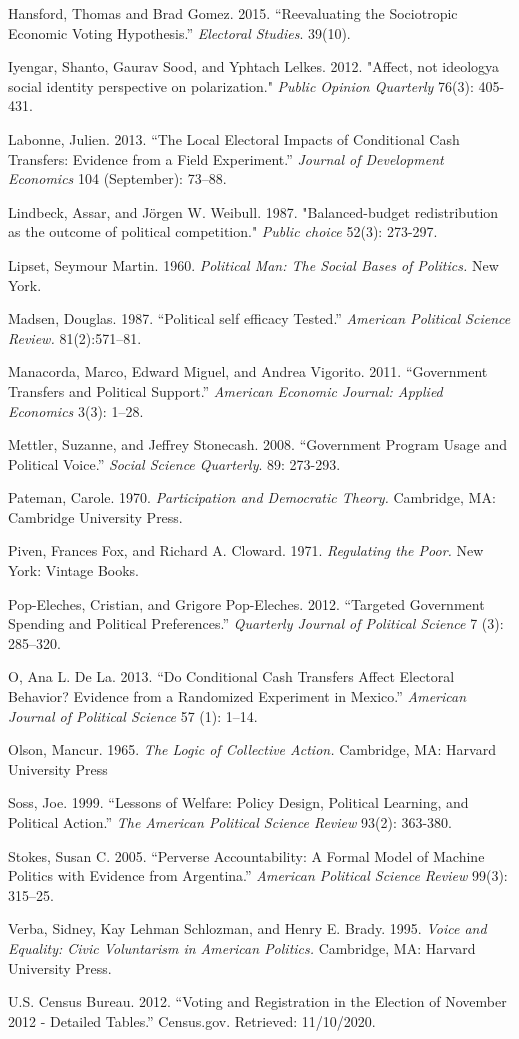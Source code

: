 \documentclass[12pt]{paper}
\begin{document}
\begin{hangparas}{.25in}{1}
Hansford, Thomas and Brad Gomez. 2015. “Reevaluating the Sociotropic Economic Voting Hypothesis.” \textit{Electoral Studies}. 39(10).

Iyengar, Shanto, Gaurav Sood, and Yphtach Lelkes. 2012. "Affect, not ideologya social identity perspective on polarization." \textit{Public Opinion Quarterly} 76(3): 405-431.

Labonne, Julien. 2013. “The Local Electoral Impacts of Conditional Cash Transfers: Evidence from a Field Experiment.” \textit{Journal of Development Economics} 104 (September): 73–88.

Lindbeck, Assar, and Jörgen W. Weibull. 1987. "Balanced-budget redistribution as the outcome of political competition." \textit{Public choice} 52(3): 273-297.

Lipset, Seymour Martin. 1960. \textit{Political Man: The Social Bases of Politics.} New York. 

Madsen, Douglas. 1987. “Political self efficacy Tested.” \textit{American Political Science Review.} 81(2):571–81.

Manacorda, Marco, Edward Miguel, and Andrea Vigorito. 2011. “Government Transfers and Political Support.” \textit{American Economic Journal: Applied Economics} 3(3): 1–28.

Mettler, Suzanne, and Jeffrey Stonecash. 2008. “Government Program Usage and Political Voice.” \textit{Social Science Quarterly}. 89: 273-293. 


Pateman, Carole. 1970. \textit{Participation and Democratic Theory. }Cambridge, MA: Cambridge University Press.


Piven, Frances Fox, and Richard A. Cloward. 1971. \textit{Regulating the Poor.} New York: Vintage Books.


Pop-Eleches, Cristian, and Grigore Pop-Eleches. 2012. “Targeted Government Spending and Political Preferences.” \textit{Quarterly Journal of Political Science} 7 (3): 285–320.


O, Ana L. De La. 2013. “Do Conditional Cash Transfers Affect Electoral Behavior? Evidence from a Randomized Experiment in Mexico.” \textit{American Journal of Political Science} 57 (1): 1–14.


Olson, Mancur. 1965. \textit{The Logic of Collective Action.} Cambridge, MA: Harvard University Press

Soss, Joe. 1999. “Lessons of Welfare: Policy Design, Political Learning, and Political Action.” \textit{The American Political Science Review} 93(2): 363-380.

Stokes, Susan C. 2005. “Perverse Accountability: A Formal Model of Machine Politics with Evidence from Argentina.” \textit{American Political Science Review } 99(3): 315–25.


Verba, Sidney, Kay Lehman Schlozman, and Henry E. Brady. 1995. \textit{Voice and Equality: Civic Voluntarism in American Politics.} Cambridge, MA: Harvard University Press.

U.S. Census Bureau. 2012. “Voting and Registration in the Election of November 2012 - Detailed Tables.” Census.gov. Retrieved: 11/10/2020.
\end{hangparas}
\clearpage
\end{document}
